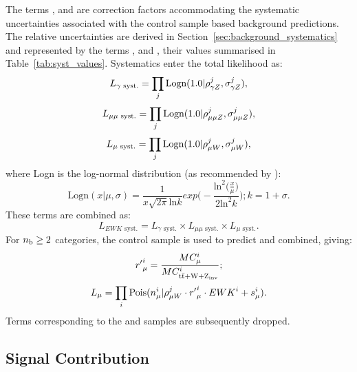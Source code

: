 The terms \rhopz, \rhommz and \rhomw are correction factors accommodating the
systematic uncertainties associated with the control sample based background 
predictions. The relative uncertainties are derived in
Section~\ref{sec:background_systematics} and represented by the terms \sigmapz, \sigmammz
and \sigmamw, their 
values summarised in Table~\ref{tab:syst_values}. Systematics enter the total
likelihood as:
% 
\begin{equation}
L_{\gamma\text{ syst.}} = \prod_j \text{Logn}(1.0 | \rho^j_{\gamma Z}, \sigma^j_{\gamma Z}),
\end{equation}
\begin{equation}
L_{\mu\mu\text{ syst.}} = \prod_j \text{Logn}(1.0 | \rho^j_{\mu\mu Z}, \sigma^j_{\mu\mu Z}),
\end{equation}
\begin{equation}
L_{\mu\text{ syst.}} = \prod_j \text{Logn}(1.0 | \rho^j_{\mu W}, \sigma^j_{\mu W}),
\end{equation}
% 
where Logn is the log-normal distribution (as recommended by \cite{cousins-log-normal}):
% 
\begin{equation}
\text{Logn}(x|\mu, \sigma) = \frac{1}{x\sqrt{2\pi}\text{ln}k} exp \Bigg(-\frac{\text{ln}^2 \big(\frac{x}{\mu}\big)}{2\text{ln}^2k}\Bigg); \xspace k = 1+\sigma .
\end{equation}
% 
These terms are combined as:
% 
\begin{equation}
L_{EWK\text{ syst.}} = L_{\gamma\text{ syst.}} \times L_{\mu\mu\text{ syst.}} \times L_{\mu\text{ syst.}}.
\end{equation}
% 
For $n_{\text{b}} \geq 2$ categories, the \mj control sample is used to predict \zinv and
\ttw combined, giving:
% 
\begin{equation}
{r'}^i_{\mu} = \frac{MC_{\mu}^i}{MC^i_{\rm{t}\bar{\rm{t}} + W + Z_{\text{inv}}}};
\end{equation}
% 
\begin{equation}
L_{\mu} = \prod_i \text{Pois}(n_{\mu}^i | \rho^j_{\mu W} \cdot {r'}_{\mu}^i \cdot {EWK}^i + s_{\mu}^i).
\end{equation}
% 
Terms corresponding to the \mmj and \gj samples are subsequently dropped.

\subsection{Signal Contribution}

